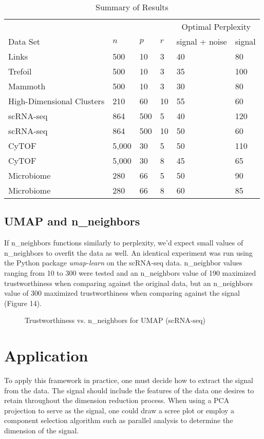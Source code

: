 \documentclass{article}
\begin{document}
\begin{table}[H]
\centering
\begin{tabular}{@{}llllll@{}}
\toprule 
 & & & & \multicolumn{2}{c}{Optimal Perplexity} \\
\cmidrule{5-6}
Data Set & $n$ & $p$ & $r$ & signal + noise & signal \\
\midrule 
Links \cite{Distill} & 500 & 10 & 3 & 40 & 80 \\
Trefoil \cite{Distill} & 500 & 10 & 3 & 35 & 100 \\
Mammoth \cite{understanding DR} & 500 & 10 & 3 & 30 & 80 \\
High-Dimensional Clusters & 210 & 60 & 10 & 55 & 60 \\
scRNA-seq \cite{scRNA data} & 864 & 500 & 5 & 40 & 120 \\
scRNA-seq \cite{scRNA data} & 864 & 500 & 10 & 50 & 60 \\
CyTOF \cite{CyTOF data} & 5,000 & 30 & 5 & 50 & 110 \\
CyTOF \cite{CyTOF data} & 5,000 & 30 & 8 & 45 & 65 \\
Microbiome \cite{enterotype data} & 280 & 66 & 5 & 50 & 90 \\
Microbiome \cite{enterotype data} & 280 & 66 & 8 & 60 & 85 \\
\bottomrule
\end{tabular}
\caption{Summary of Results}
\end{table}

\subsection{UMAP and n\_neighbors}
If n\_neighbors functions similarly to perplexity, we'd expect small values of n\_neighbors to overfit the data as well. An identical experiment was run using the Python package \textit{umap-learn} \cite{umap} on the scRNA-seq data. n\_neighbor values ranging from 10 to 300 were tested and an n\_neighbors value of 190 maximized trustworthiness when comparing against the original data, but an n\_neighbors value of 300 maximized trustworthiness when comparing against the signal (Figure 14).

\renewcommand{\thefigure}{14}
\begin{figure}[H]
\centering
\caption{Trustworthiness vs. n\_neighbors for UMAP (scRNA-seq)}
\end{figure}

\section{Application}
To apply this framework in practice, one must decide how to extract the signal from the data. The signal should include the features of the data one desires to retain throughout the dimension reduction process. When using a PCA projection to serve as the signal, one could draw a scree plot or employ a component selection algorithm such as parallel analysis \cite{parallel analysis} to determine the dimension of the signal.
\end{document}
